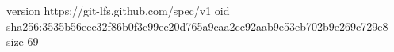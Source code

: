 version https://git-lfs.github.com/spec/v1
oid sha256:3535b56eee32f86b0f3c99ee20d765a9caa2cc92aab9e53eb702b9e269c729e8
size 69
